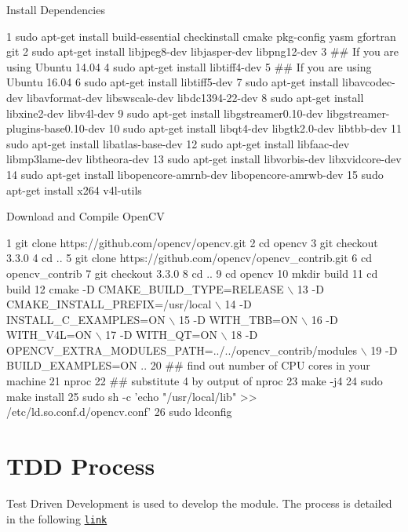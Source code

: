 Install Dependencies 
\begin{DoxyCode}
1 sudo apt-get install build-essential checkinstall cmake pkg-config yasm gfortran git
2 sudo apt-get install libjpeg8-dev libjasper-dev libpng12-dev
3 ## If you are using Ubuntu 14.04
4 sudo apt-get install libtiff4-dev
5 ## If you are using Ubuntu 16.04
6 sudo apt-get install libtiff5-dev
7 sudo apt-get install libavcodec-dev libavformat-dev libswscale-dev libdc1394-22-dev
8 sudo apt-get install libxine2-dev libv4l-dev
9 sudo apt-get install libgstreamer0.10-dev libgstreamer-plugins-base0.10-dev
10 sudo apt-get install libqt4-dev libgtk2.0-dev libtbb-dev
11 sudo apt-get install libatlas-base-dev
12 sudo apt-get install libfaac-dev libmp3lame-dev libtheora-dev
13 sudo apt-get install libvorbis-dev libxvidcore-dev
14 sudo apt-get install libopencore-amrnb-dev libopencore-amrwb-dev
15 sudo apt-get install x264 v4l-utils
\end{DoxyCode}
 Download and Compile Open\+CV 
\begin{DoxyCode}
1 git clone https://github.com/opencv/opencv.git
2 cd opencv 
3 git checkout 3.3.0 
4 cd ..
5 git clone https://github.com/opencv/opencv\_contrib.git
6 cd opencv\_contrib
7 git checkout 3.3.0
8 cd ..
9 cd opencv
10 mkdir build
11 cd build
12 cmake -D CMAKE\_BUILD\_TYPE=RELEASE \(\backslash\)
13       -D CMAKE\_INSTALL\_PREFIX=/usr/local \(\backslash\)
14       -D INSTALL\_C\_EXAMPLES=ON \(\backslash\)
15       -D WITH\_TBB=ON \(\backslash\)
16       -D WITH\_V4L=ON \(\backslash\)
17       -D WITH\_QT=ON \(\backslash\)
18       -D OPENCV\_EXTRA\_MODULES\_PATH=../../opencv\_contrib/modules \(\backslash\)
19       -D BUILD\_EXAMPLES=ON ..
20 ## find out number of CPU cores in your machine
21 nproc
22 ## substitute 4 by output of nproc
23 make -j4
24 sudo make install
25 sudo sh -c 'echo "/usr/local/lib" >> /etc/ld.so.conf.d/opencv.conf'
26 sudo ldconfig
\end{DoxyCode}
 \section*{T\+DD Process}

Test Driven Development is used to develop the module. The process is detailed in the following \href{https://docs.google.com/spreadsheets/d/1EZE9dxY_vlz4glKEceYtc5kQ3OyYQjs5Zh9BSKF8AoA/edit?usp=sharing}{\tt link} 